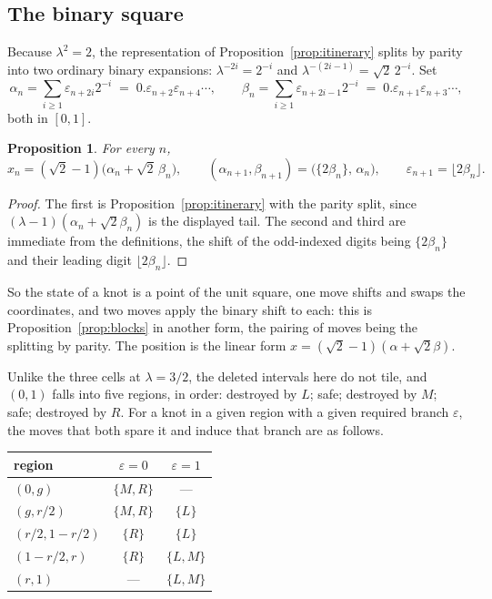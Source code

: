 \documentclass[11pt,reqno]{amsart}
\theoremstyle{plain}
\newtheorem{proposition}[theorem]{Proposition}
\theoremstyle{definition}
\theoremstyle{remark}
\begin{document}
\subsection{The binary square}

Because $\lambda^2=2$, the representation of Proposition~\ref{prop:itinerary}
splits by parity into two ordinary binary expansions:
$\lambda^{-2i}=2^{-i}$ and $\lambda^{-(2i-1)}=\sqrt2\,2^{-i}$. Set
\[
  \alpha_n=\sum_{i\geq1}\varepsilon_{n+2i}2^{-i}
  \;=\;0.\varepsilon_{n+2}\varepsilon_{n+4}\cdots,
  \qquad
  \beta_n=\sum_{i\geq1}\varepsilon_{n+2i-1}2^{-i}
  \;=\;0.\varepsilon_{n+1}\varepsilon_{n+3}\cdots,
\]
both in $[0,1]$.

\begin{proposition}\label{prop:square}
For every $n$,
\[
  x_n=(\sqrt2-1)\bigl(\alpha_n+\sqrt2\,\beta_n\bigr),
  \qquad
  (\alpha_{n+1},\beta_{n+1})=\bigl(\{2\beta_n\},\,\alpha_n\bigr),
  \qquad
  \varepsilon_{n+1}=\lfloor 2\beta_n\rfloor .
\]
\end{proposition}

\begin{proof}
The first is Proposition~\ref{prop:itinerary} with the parity split, since
$(\lambda-1)(\alpha_n+\sqrt2\beta_n)$ is the displayed tail. The second and
third are immediate from the definitions, the shift of the odd-indexed digits
being $\{2\beta_n\}$ and their leading digit $\lfloor2\beta_n\rfloor$.
\end{proof}

So the state of a knot is a point of the unit square, one move shifts and swaps
the coordinates, and two moves apply the binary shift to each: this is
Proposition~\ref{prop:blocks} in another form, the pairing of moves being the
splitting by parity. The position is the linear form
$x=(\sqrt2-1)(\alpha+\sqrt2\beta)$.

Unlike the three cells at $\lambda=3/2$, the deleted intervals here do not tile,
and $(0,1)$ falls into five regions, in order: destroyed by $L$; safe; destroyed
by $M$; safe; destroyed by $R$. For a knot in a given region with a given
required branch $\varepsilon$, the moves that both spare it and induce that
branch are as follows.

\begin{center}
\begin{tabular}{lcc}
\toprule
region & $\varepsilon=0$ & $\varepsilon=1$\\
\midrule
$(0,g)$ & $\{M,R\}$ & ---\\
$(g,r/2)$ & $\{M,R\}$ & $\{L\}$\\
$(r/2,1-r/2)$ & $\{R\}$ & $\{L\}$\\
$(1-r/2,r)$ & $\{R\}$ & $\{L,M\}$\\
$(r,1)$ & --- & $\{L,M\}$\\
\bottomrule
\end{tabular}
\end{center}
\end{document}
